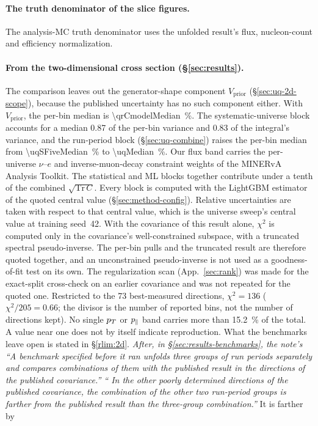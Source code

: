 \paragraph{The truth denominator of the slice figures.} The analysis-MC truth denominator uses the unfolded result's flux, nucleon-count and efficiency normalization.

\paragraph{From the two-dimensional cross section (\S\ref{sec:results}).} The comparison leaves out the generator-shape component $V_{\mathrm{prior}}$ (\S\ref{sec:uq-2d-scope}), because the published uncertainty has no such component either. With $V_{\mathrm{prior}}$, the per-bin median is \SI{\qrCmodelMedian}{\percent}. The systematic-universe block accounts for a median 0.87 of the per-bin variance and 0.83 of the integral's variance, and the run-period block (\S\ref{sec:uq-combine}) raises the per-bin median from \SI{\uqSFiveMedian}{\percent} to \SI{\uqMedian}{\percent}. Our flux band carries the per-universe $\nu$--$e$ and inverse-muon-decay constraint weights of the MINERvA Analysis Toolkit. The statistical and ML blocks together contribute under a tenth of the combined $\sqrt{\mathrm{Tr}\,C}$. Every block is computed with the LightGBM estimator of the quoted central value (\S\ref{sec:method-config}). Relative uncertainties are taken with respect to that central value, which is the universe sweep's central value at training seed~42. With the covariance of this result alone, $\chi^{2}$ is computed only in the covariance's well-constrained subspace, with a truncated spectral pseudo-inverse. The per-bin pulls and the truncated result are therefore quoted together, and an unconstrained pseudo-inverse is not used as a goodness-of-fit test on its own. The regularization scan (App.~\ref{sec:rank}) was made for the exact-split cross-check on an earlier covariance and was not repeated for the quoted one. Restricted to the 73 best-measured directions, $\chi^{2}=136$ ($\chi^{2}/205=0.66$; the divisor is the number of reported bins, not the number of directions kept). No single $p_{T}$ or $p_{\parallel}$ band carries more than \SI{15.2}{\percent} of the total. A value near one does not by itself indicate reproduction. What the benchmarks leave open is stated in \S\ref{rlim:2d}. \emph{After, in \S\ref{sec:results-benchmarks}, the note's ``A benchmark specified before it ran unfolds three groups of run periods separately and compares combinations of them with the published result in the directions of the published covariance.'' `` In the other  poorly determined directions of the published covariance, the combination of the other two run-period groups is farther from the published result than the three-group combination.''} It is farther by 